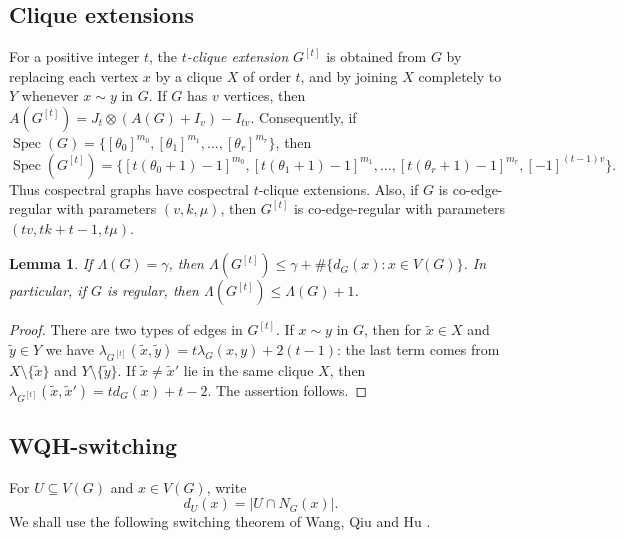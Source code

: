 \documentclass[reqno,a4paper,11pt]{article}
\newtheorem{lem}[thm]{Lemma}
\theoremstyle{definition}
\theoremstyle{remark}
\DeclareMathOperator{\Spec}{Spec}
\begin{document}
\subsection{Clique extensions}
For a positive integer $t$, the \emph{$t$-clique extension} $G^{[t]}$ is obtained from $G$ by replacing each vertex $x$ by a clique $ X$ of order $t$, and by joining $X$ completely to $Y$ whenever $x\sim y$ in $G$.  If $G$ has $v$ vertices, then $A(G^{[t]})=J_t\otimes(A(G)+I_v)-I_{tv}$.  Consequently, if $\Spec(G)=\{[\theta_0]^{m_0},[\theta_1]^{m_1},\ldots,[\theta_r]^{m_r}\}$, then
\begin{equation}\label{cliext}
\Spec(G^{[t]})=\{[t(\theta_0+1)-1]^{m_0},[t(\theta_1+1)-1]^{m_1},\ldots,[t(\theta_r+1)-1]^{m_r},[-1]^{(t-1)v}\}.
\end{equation}
Thus cospectral graphs have cospectral $t$-clique extensions.  Also, if $G$ is co-edge-regular with parameters $(v,k,\mu)$, then $G^{[t]}$ is co-edge-regular with parameters $(tv,tk+t-1,t\mu)$.

\begin{lem}\label{lam cl ext}
If $\Lambda(G)=\gamma$, then $\Lambda(G^{[t]})\le \gamma+\#\{d_G(x):x\in V(G)\}$.  In particular, if $G$ is regular, then $\Lambda(G^{[t]})\le \Lambda(G)+1$.
\end{lem}

\begin{proof}
There are two types of edges in $G^{[t]}$.  If $x\sim y$ in $G$, then for $\widetilde x\in X$ and $\widetilde y\in Y$ we have $\lambda_{G^{[t]}}(\widetilde x,\widetilde y)=t\lambda_G(x,y)+2(t-1)$: the last term comes from $X\setminus\{\widetilde x\}$ and $ Y\setminus\{\widetilde y\}$.  If $\widetilde x\ne\widetilde x'$ lie in the same clique $ X$, then $\lambda_{G^{[t]}}(\widetilde x,\widetilde x')=td_G(x)+t-2$.  The assertion follows.
\end{proof}

\subsection{WQH-switching}\label{GM}
For $U\subseteq V(G)$ and $x\in V(G)$, write
\[
d_U(x)=|U\cap N_G(x)|.
\]
We shall use the following switching theorem of Wang, Qiu and Hu \cite{WQH2019}.
\end{document}
